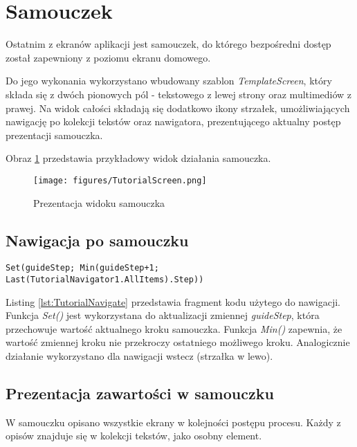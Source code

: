 \section{Samouczek}

Ostatnim z ekranów aplikacji jest samouczek, do którego bezpośredni dostęp został zapewniony z poziomu ekranu domowego.

Do jego wykonania wykorzystano wbudowany szablon \emph{TemplateScreen}, który składa się z dwóch pionowych pól - tekstowego z lewej strony oraz multimediów z prawej. Na widok całości składają się dodatkowo ikony strzałek, umożliwiających nawigację po kolekcji tekstów oraz nawigatora, prezentującego aktualny postęp prezentacji samouczka.

Obraz \ref{fig:tutorial} przedstawia przykładowy widok działania samouczka.

\begin{figure}[H]
    \centering
    \texttt{[image: figures/TutorialScreen.png]}
    \caption{Prezentacja widoku samouczka}
    \label{fig:tutorial}
\end{figure}

\subsection{Nawigacja po samouczku}

\begin{lstlisting}[language=PowerFx]
Set(guideStep; Min(guideStep+1; Last(TutorialNavigator1.AllItems).Step))
\end{lstlisting}

Listing \ref{lst:TutorialNavigate} przedstawia fragment kodu użytego do nawigacji. Funkcja \emph{Set()} jest wykorzystana do aktualizacji zmiennej \emph{guideStep}, która przechowuje wartość aktualnego kroku samouczka. Funkcja \emph{Min()} zapewnia, że wartość zmiennej kroku nie przekroczy ostatniego możliwego kroku.  Analogicznie działanie wykorzystano dla nawigacji wstecz (strzałka w lewo).

\subsection{Prezentacja zawartości w samouczku}

W samouczku opisano wszystkie ekrany w kolejności postępu procesu. Każdy z opisów znajduje się w kolekcji tekstów, jako osobny element.

